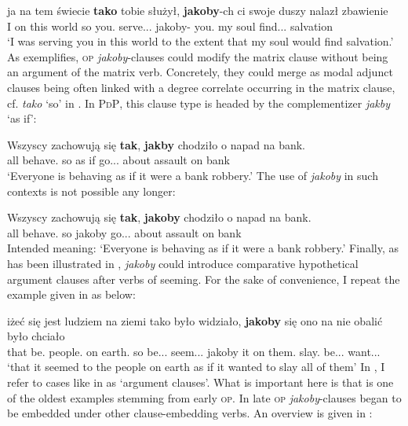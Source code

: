 \documentclass[output=paper
,modfonts
,nonflat]{langsci/langscibook}
\begin{document}
\ea \gll ja na tem świecie \textbf{tako} tobie służył, \textbf{jakoby}-ch ci swoje duszy nalazł zbawienie \label{adjunct-jakoby} \\
		I on this world so you.{\dat} serve.{\lptcp}.{\sg}.{\masc} jakoby-{\aor} you.{\dat} my soul find.{\lptcp}.{\sg}.{\masc} salvation \\
\glt	`I was serving you in this world to the extent that my soul would find salvation.' 
\z
As  exemplifies, \textsc{op} \emph{jakoby}-clauses could modify the matrix clause without being an argument of the matrix verb. Concretely, they could merge as modal adjunct clauses being often linked with a degree correlate occurring in the matrix clause, cf. \emph{tako} `so' in . In \textsc{PdP}, this clause type is headed by the complementizer \emph{jakby} `as if':

\ea \gll Wszyscy zachowują się \textbf{tak}, \textbf{jakby} chodziło o napad na bank. \\
		all behave.{\thirdperson}{\pl} {} so {as if} go.{\lptcp}.{\sg}.{\n} about assault on bank \\
\glt	`Everyone is behaving as if it were a bank robbery.' 
\z
The use of \emph{jakoby} in such contexts is not possible any longer:

\ea \gll *Wszyscy zachowują się \textbf{tak}, \textbf{jakoby} chodziło o napad na bank. \\
		all behave.{\thirdperson}{\pl} {} so jakoby go.{\lptcp}.{\sg}.{\n} about assault on bank \\
\glt	Intended meaning: `Everyone is behaving as if it were a bank robbery.'
\z
Finally, as has been illustrated in , \emph{jakoby} could introduce comparative hypothetical argument clauses after verbs of seeming. For the sake of convenience, I repeat the example given in  as  below:

\ea \gll iżeć się jest ludziem na ziemi tako było widziało, \textbf{jakoby} się ono na nie obalić było chciało \label{tee2} \\
			that {} be.{\thirdperson}{\sg} people.{\dat} on earth.{\LOC} so be.{\lptcp}.{\sg}.{\n} seem.{\lptcp}.{\sg}.{\n} jakoby {} it on them.{\acc} slay.{\infv} be.{\lptcp}.{\sg}.{\n} want.{\lptcp}.{\sg}.{\n} \\
\glt	`that it seemed to the people on earth as if it wanted to slay all of them' 
\z
In , I refer to cases like in   as `argument clauses'. What is important here is that  is one of the oldest examples stemming from early \textsc{op}. In late \textsc{op} \emph{jakoby}-clauses began to be embedded under other clause-embedding verbs. An overview is given in :
\end{document}
